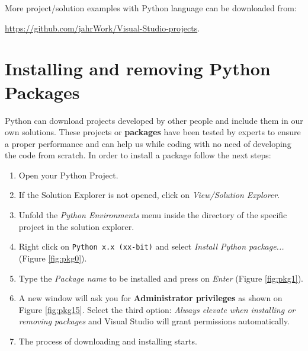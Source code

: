 \begin{IN}
    More project/solution examples with Python language can be downloaded from:
    
     \url{https://github.com/jahrWork/Visual-Studio-projects}.
\end{IN}

    \section{Installing and removing Python Packages}

Python can download projects developed by other people and include them in our own solutions. These projects or \textbf{packages} have been tested by experts to ensure a proper performance and can help us while coding with no need of developing the code from scratch. In order to install a package follow the next steps:

\newpage
\begin{enumerate}[nosep]
	\item Open your Python Project.
	\item If the Solution Explorer is not opened, click on \textit{View/Solution Explorer}.
	\item Unfold the \textit{Python Environments} menu inside the directory of the specific project in the solution explorer.
	\item Right click on \texttt{Python x.x (xx-bit)} and select \textit{Install Python package...} (Figure \ref{fig:pkg0}).
	\item Type the \textit{Package name} to be installed and press on \textit{Enter} (Figure \ref{fig:pkg1}).
	\item A new window will ask you for \textbf{Administrator privileges} as shown on Figure \ref{fig:pkg15}. Select the third option: \textit{Always elevate when installing or removing packages} and Visual Studio will grant permissions automatically.
    \item The process of downloading and installing starts.
\end{enumerate}

